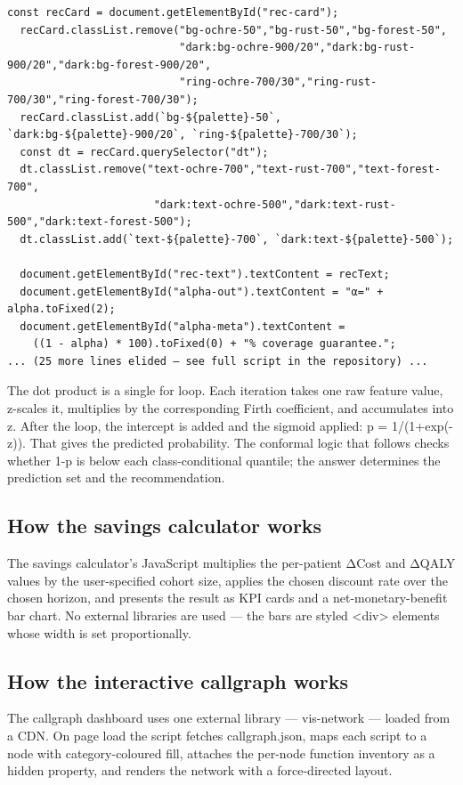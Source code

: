 \documentclass[11pt,a4paper]{article}
\begin{document}
\begin{lstlisting}[style=jsblock]
  const recCard = document.getElementById("rec-card");
  recCard.classList.remove("bg-ochre-50","bg-rust-50","bg-forest-50",
                           "dark:bg-ochre-900/20","dark:bg-rust-900/20","dark:bg-forest-900/20",
                           "ring-ochre-700/30","ring-rust-700/30","ring-forest-700/30");
  recCard.classList.add(`bg-${palette}-50`, `dark:bg-${palette}-900/20`, `ring-${palette}-700/30`);
  const dt = recCard.querySelector("dt");
  dt.classList.remove("text-ochre-700","text-rust-700","text-forest-700",
                       "dark:text-ochre-500","dark:text-rust-500","dark:text-forest-500");
  dt.classList.add(`text-${palette}-700`, `dark:text-${palette}-500`);

  document.getElementById("rec-text").textContent = recText;
  document.getElementById("alpha-out").textContent = "α=" + alpha.toFixed(2);
  document.getElementById("alpha-meta").textContent =
    ((1 - alpha) * 100).toFixed(0) + "% coverage guarantee.";
... (25 more lines elided — see full script in the repository) ...
\end{lstlisting}

The dot product is a single for loop. Each iteration takes one raw feature value, z-scales it, multiplies by the corresponding Firth coefficient, and accumulates into z. After the loop, the intercept is added and the sigmoid applied: p = 1/(1+exp(-z)). That gives the predicted probability. The conformal logic that follows checks whether 1-p is below each class-conditional quantile; the answer determines the prediction set and the recommendation.
\subsection{How the savings calculator works}
The savings calculator's JavaScript multiplies the per-patient ΔCost and ΔQALY values by the user-specified cohort size, applies the chosen discount rate over the chosen horizon, and presents the result as KPI cards and a net-monetary-benefit bar chart. No external libraries are used --- the bars are styled <div> elements whose width is set proportionally.
\subsection{How the interactive callgraph works}
The callgraph dashboard uses one external library --- vis-network --- loaded from a CDN. On page load the script fetches callgraph.json, maps each script to a node with category-coloured fill, attaches the per-node function inventory as a hidden property, and renders the network with a force-directed layout.
\clearpage
\end{document}
